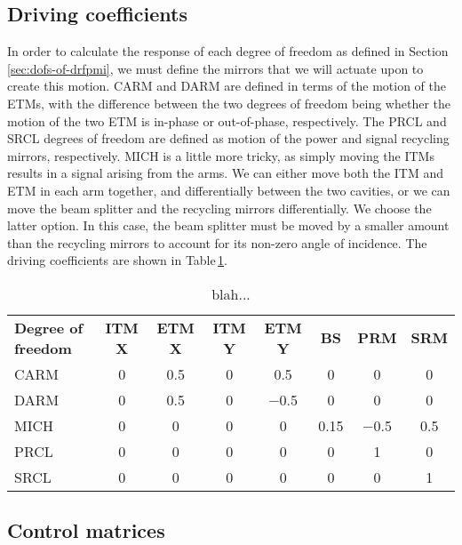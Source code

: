 \subsection{Driving coefficients}
In order to calculate the response of each degree of freedom as defined in Section\,\ref{sec:dofs-of-drfpmi}, we must define the mirrors that we will actuate upon to create this motion. \gls{CARM} and \gls{DARM} are defined in terms of the motion of the \glspl{ETM}, with the difference between the two degrees of freedom being whether the motion of the two \gls{ETM} is in-phase or out-of-phase, respectively. The \gls{PRCL} and \gls{SRCL} degrees of freedom are defined as motion of the power and signal recycling mirrors, respectively. \gls{MICH} is a little more tricky, as simply moving the \glspl{ITM} results in a signal arising from the arms. We can either move both the \gls{ITM} and \gls{ETM} in each arm together, and differentially between the two cavities, or we can move the beam splitter and the recycling mirrors differentially. We choose the latter option. In this case, the beam splitter must be moved by a smaller amount than the recycling mirrors to account for its non-zero angle of incidence. The driving coefficients are shown in Table\,\ref{tab:et-lf-driving-coefficients}.

\begin{table}
  \centering
  \begin{tabular}{lccccccc}
    \textbf{Degree of freedom} & \textbf{\gls{ITM} X} & \textbf{\gls{ETM} X} & \textbf{\gls{ITM} Y} & \textbf{\gls{ETM} Y} & \textbf{\gls{BS}} & \textbf{\gls{PRM}} & \textbf{\gls{SRM}} \\
    \gls{CARM} & \num{0} & \num{0.5} & \num{0} & \num{0.5} & \num{0} & \num{0} & \num{0} \\
    \gls{DARM} & \num{0} & \num{0.5} & \num{0} & \num{-0.5} & \num{0} & \num{0} & \num{0} \\
    \gls{MICH} & \num{0} & \num{0} & \num{0} & \num{0} & \num{0.15} & \num{-0.5} & \num{0.5} \\
    \gls{PRCL} & \num{0} & \num{0} & \num{0} & \num{0} & \num{0} & \num{1} & \num{0} \\
    \gls{SRCL} & \num{0} & \num{0} & \num{0} & \num{0} & \num{0} & \num{0} & \num{1} \\
  \end{tabular}
  \caption{\label{tab:et-lf-driving-coefficients}blah...}
\end{table}

\subsection{Control matrices}

